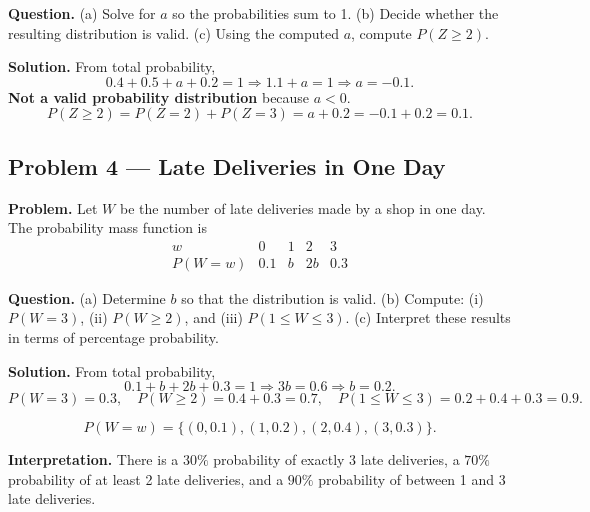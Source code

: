\begin{ExamProblems}
		\textbf{Question.}
		(a) Solve for $a$ so the probabilities sum to 1.
		(b) Decide whether the resulting distribution is valid.
		(c) Using the computed $a$, compute $P(Z\ge 2)$.
		
		\textbf{Solution.}
		From total probability,
		\[
		0.4+0.5+a+0.2=1\Rightarrow 1.1+a=1\Rightarrow a=-0.1.
		\]
		\textbf{Not a valid probability distribution} because $a<0$.
		\[
		P(Z\ge 2)=P(Z=2)+P(Z=3)=a+0.2=-0.1+0.2=0.1.
		\]
		
		
		\item
		\subsection*{Problem 4 — Late Deliveries in One Day}
		
		\textbf{Problem.}
		Let $W$ be the number of late deliveries made by a shop in one day. The probability mass function is
		\[
		\begin{array}{c|cccc}
			w & 0 & 1 & 2 & 3\\
			\hline
			P(W=w) & 0.1 & b & 2b & 0.3
		\end{array}
		\]
		
		\textbf{Question.}
		(a) Determine $b$ so that the distribution is valid.
		(b) Compute: (i) $P(W=3)$, (ii) $P(W\ge 2)$, and (iii) $P(1\le W\le 3)$.
		(c) Interpret these results in terms of percentage probability.
		
		\textbf{Solution.}
		From total probability,
		\[
		0.1+b+2b+0.3=1\Rightarrow 3b=0.6\Rightarrow b=0.2.
		\]
		\[
		P(W=3)=0.3,\quad
		P(W\ge 2)=0.4+0.3=0.7,\quad
		P(1\le W\le 3)=0.2+0.4+0.3=0.9.
		\]
		
\[
		P(W=w)=\{(0,0.1),(1,0.2),(2,0.4),(3,0.3)\}.
		\]
\begin{center}
		\end{center}
\textbf{Interpretation.} There is a $30\%$ probability of exactly 3 late deliveries, a $70\%$ probability of at least 2 late deliveries, and a $90\%$ probability of between 1 and 3 late deliveries.
		

\end{ExamProblems}
